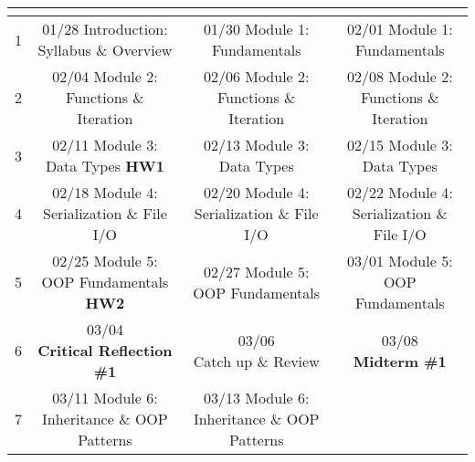 \documentclass[11pt]{article}
\begin{document}
\begin{tabular}{| r | c | c | c |}
	\hline
	\cellcolor{gray!40} \colorbox{gray!40}{\makecell{Week}} &
	\cellcolor{gray!40} \colorbox{gray!40}{\makecell{Monday}} &
	\cellcolor{gray!40} \colorbox{gray!40}{\makecell{Wednesday}} &
	\cellcolor{gray!40} \colorbox{gray!40}{\makecell{Friday}} \\
	\hline 1 & 
	\makecell{01/28 Introduction: \\Syllabus \& Overview} & 
	\makecell{01/30 Module 1: \\Fundamentals} & 
	\makecell{02/01 Module 1: \\Fundamentals} \\
	\hline 2 & 
	\makecell{02/04 Module 2: \\Functions \& Iteration} & 
	\makecell{02/06 Module 2: \\Functions \& Iteration} & 
	\makecell{02/08 Module 2: \\Functions \& Iteration} \\
	\hline 3 & 
	\makecell{02/11 Module 3: \\Data Types \textbf{HW1}} & 
	\makecell{02/13 Module 3: \\Data Types} & 
	\makecell{02/15 Module 3: \\Data Types} \\
	\hline 4 & 
	\makecell{02/18 Module 4: \\Serialization \& File I/O} & 
	\makecell{02/20 Module 4: \\Serialization \& File I/O} &
	\makecell{02/22 Module 4: \\Serialization \& File I/O} \\
	\hline 5 &
	\makecell{02/25 Module 5: \\OOP Fundamentals \textbf{HW2}} &
	\makecell{02/27 Module 5: \\OOP Fundamentals} &
	\makecell{03/01 Module 5: \\OOP Fundamentals} \\
	\hline 6 &
	\makecell{03/04 \\ \textbf{Critical Reflection \#1}} &
	\makecell{03/06 \\ Catch up \& Review} &
	\makecell{03/08 \\ \textbf{Midterm \#1}} \\
	\hline 7 &
	\makecell{03/11 Module 6: \\Inheritance \& OOP Patterns} &
	\makecell{03/13 Module 6: \\Inheritance \& OOP Patterns} &

\end{tabular}
\end{document}
